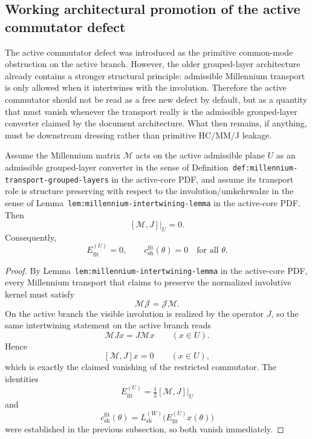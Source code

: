 \subsection*{Working architectural promotion of the active commutator defect}

The active commutator defect was introduced as the primitive common-mode obstruction on the active branch. However, the older grouped-layer architecture already contains a stronger structural principle: admissible Millennium transport is only allowed when it intertwines with the involution. Therefore the active commutator should not be read as a free new defect by default, but as a quantity that must vanish whenever the transport really is the admissible grouped-layer converter claimed by the document architecture. What then remains, if anything, must be downstream dressing rather than primitive HC/MM/J leakage.

\begin{theorem}
Assume the Millennium matrix $\mathcal M$ acts on the active admissible plane $U$ as an admissible grouped-layer converter in the sense of Definition~\texttt{def:millennium-transport-grouped-layers} in the active-core PDF, and assume its transport role is structure preserving with respect to the involution/umkehrwalze in the sense of Lemma~\texttt{lem:millennium-intertwining-lemma} in the active-core PDF. Then
\[
  [\mathcal M,J]\big|_{U}=0.
\]
Consequently,
\[
  E_{\mathrm{fit}}^{(U)}=0,
  \qquad
  c_{\mathrm{sh}}^{\mathrm{fit}}(\theta)=0
  \quad\text{for all }\theta.
\]
\end{theorem}

\begin{proof}
By Lemma~\texttt{lem:millennium-intertwining-lemma} in the active-core PDF, every Millennium transport that claims to preserve the normalized involutive kernel must satisfy
\[
  \mathcal M\mathcal J=\mathcal J\mathcal M.
\]
On the active branch the visible involution is realized by the operator $J$, so the same intertwining statement on the active branch reads
\[
  \mathcal M Jx=J\mathcal M x
  \qquad (x\in U).
\]
Hence
\[
  [\mathcal M,J]x=0
  \qquad (x\in U),
\]
which is exactly the claimed vanishing of the restricted commutator. The identities
\[
  E_{\mathrm{fit}}^{(U)}=\tfrac12[\mathcal M,J]\big|_{U}
\]
and
\[
  c_{\mathrm{sh}}^{\mathrm{fit}}(\theta)=L_{\mathrm{sh}}^{(W)}\bigl(E_{\mathrm{fit}}^{(U)}x(\theta)\bigr)
\]
were established in the previous subsection, so both vanish immediately.
\end{proof}

